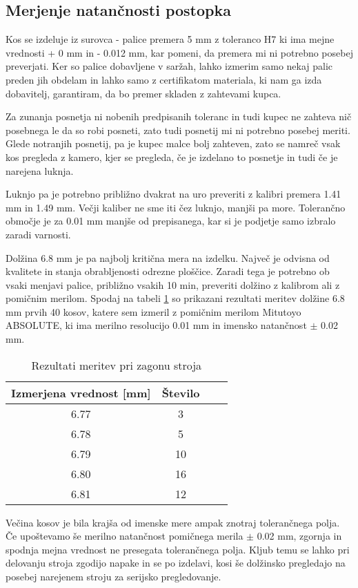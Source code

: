 \subsection{Merjenje natančnosti postopka}
Kos se izdeluje iz surovca - palice premera 5 mm z toleranco
H7 ki ima mejne vrednosti + 0 mm in - 0.012 mm, kar pomeni,
da premera mi ni potrebno posebej preverjati. Ker so palice
dobavljene v saržah, lahko izmerim samo nekaj palic preden
jih obdelam in lahko samo z certifikatom materiala, ki nam
ga izda dobavitelj, garantiram, da bo premer skladen z
zahtevami kupca.

Za zunanja posnetja ni nobenih predpisanih toleranc in tudi
kupec ne zahteva nič posebnega le da so robi posneti, zato
tudi posnetij mi ni potrebno posebej meriti. Glede notranjih
posnetij, pa je kupec malce bolj zahteven, zato se namreč
vsak kos pregleda z kamero, kjer se pregleda, če je izdelano
to posnetje in tudi če je narejena luknja.

Luknjo pa je potrebno približno dvakrat na uro preveriti z
kalibri premera 1.41 mm in 1.49 mm. Večji kaliber ne sme iti
čez luknjo, manjši pa more. Tolerančno območje je za 0.01 mm
manjše od prepisanega, kar si je podjetje samo izbralo zaradi
varnosti.

Dolžina 6.8 mm je pa najbolj kritična mera na izdelku.
Največ je odvisna od kvalitete in stanja obrabljenosti
odrezne ploščice. Zaradi tega je potrebno ob vsaki menjavi
palice, približno vsakih 10 min, preveriti dolžino z kalibrom
ali z pomičnim merilom. Spodaj na tabeli \ref{tabela_meritev}
so prikazani rezultati meritev dolžine 6.8 mm prvih 40 kosov,
katere sem izmeril z pomičnim merilom Mitutoyo ABSOLUTE,
ki ima merilno resolucijo 0.01 mm in imensko natančnost \(\pm\) 0.02 mm.

\begin{table}[H]
	\caption{Rezultati meritev pri zagonu stroja}
	\label{tabela_meritev}
	\begin{center}
		\begin{tabular}{|c|c|c|c|}
			\hline
			Izmerjena vrednost [mm] & Število \\
			\hline
			6.77                    & 3       \\
			\hline
			6.78                    & 5       \\
			\hline
			6.79                    & 10      \\
			\hline
			6.80                    & 16      \\
			\hline
			6.81                    & 12      \\
			\hline
		\end{tabular}
	\end{center}
\end{table}

Večina kosov je bila krajša od imenske mere ampak znotraj tolerančnega
polja. Če upoštevamo še merilno natančnost pomičnega merila \(\pm\) 0.02 mm,
zgornja in spodnja mejna vrednost ne presegata tolerančnega polja.
Kljub temu se lahko pri delovanju stroja zgodijo napake
in se po izdelavi, kosi še dolžinsko pregledajo na posebej
narejenem stroju za serijsko pregledovanje.